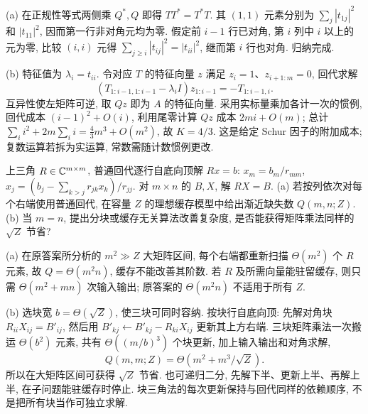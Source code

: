 \begin{solution}
(a) 在正规性等式两侧乘 $Q^*,Q$ 即得 $TT^*=T^*T$. 其 $(1,1)$ 元素分别为 $\sum_j|t_{1j}|^2$ 和 $|t_{11}|^2$, 因而第一行非对角元均为零. 假定前 $i-1$ 行已对角, 第 $i$ 列中 $i$ 以上的元为零, 比较 $(i,i)$ 元得 $\sum_{j\ge i}|t_{ij}|^2=|t_{ii}|^2$, 继而第 $i$ 行也对角. 归纳完成.

(b) 特征值为 $\lambda_i=t_{ii}$. 令对应 $T$ 的特征向量 $z$ 满足 $z_i=1$、$z_{i+1:m}=0$, 回代求解
\[
 (T_{1:i-1,1:i-1}-\lambda_i I)z_{1:i-1}=-T_{1:i-1,i}.
\]
互异性使左矩阵可逆, 取 $Qz$ 即为 $A$ 的特征向量. 采用实标量乘加各计一次的惯例, 回代成本 $(i-1)^2+O(i)$, 利用尾零计算 $Qz$ 成本 $2mi+O(m)$; 总计 $\sum_i i^2+2m\sum_i i=\tfrac43m^3+O(m^2)$, 故 $K=4/3$. 这是给定 Schur 因子的附加成本; 复数运算若拆为实运算, 常数需随计数惯例更改.
\end{solution}
\begin{exercise}\label{ps3:q3}
上三角 $R\in\mathbb C^{m\times m}$, 普通回代逐行自底向顶解 $Rx=b$: $x_m=b_m/r_{mm}$, $x_j=(b_j-\sum_{k>j}r_{jk}x_k)/r_{jj}$.
对 $m\times n$ 的 $B,X$, 解 $RX=B$.
(a) 若按列依次对每个右端使用普通回代, 在容量 $Z$ 的理想缓存模型中给出渐近缺失数 $Q(m,n;Z)$.
(b) 当 $m=n$, 提出分块或缓存无关算法改善复杂度, 是否能获得矩阵乘法同样的 $\sqrt Z$ 节省?
\end{exercise}
\begin{solution}
(a) 在原答案所分析的 $m^2\gg Z$ 大矩阵区间, 每个右端都重新扫描 $\Theta(m^2)$ 个 $R$ 元素, 故 $Q=\Theta(m^2n)$, 缓存不能改善其阶数. 若 $R$ 及所需向量能驻留缓存, 则只需 $\Theta(m^2+mn)$ 次输入输出; 原答案的 $\Theta(m^2n)$ 不适用于所有 $Z$.

(b) 选块宽 $b=\Theta(\sqrt Z)$, 使三块可同时容纳. 按块行自底向顶: 先解对角块 $R_{ii}X_{ij}=B'_{ij}$, 然后用 $B'_{kj}\leftarrow B'_{kj}-R_{ki}X_{ij}$ 更新其上方右端. 三块矩阵乘法一次搬运 $\Theta(b^2)$ 元素, 共有 $\Theta((m/b)^3)$ 个块更新, 加上输入输出和对角求解,
\[
 Q(m,m;Z)=\Theta(m^2+m^3/\sqrt Z).
\]
所以在大矩阵区间可获得 $\sqrt Z$ 节省. 也可递归二分, 先解下半、更新上半、再解上半, 在子问题能驻缓存时停止. 块三角法的每次更新保持与回代同样的依赖顺序, 不是把所有块当作可独立求解.
\end{solution}
